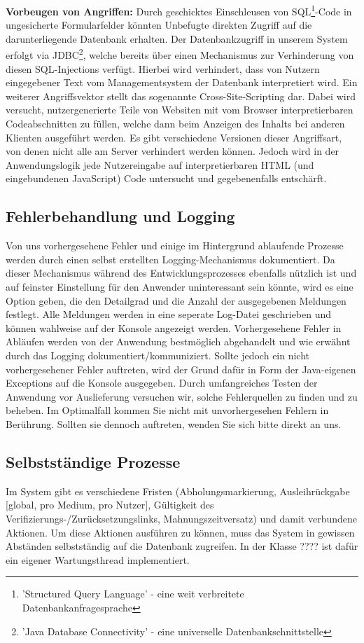 \documentclass{article}
\begin{document}
\textbf{Vorbeugen von Angriffen:} Durch geschicktes Einschleusen von SQL\footnote{'Structured Query Language' - eine weit verbreitete Datenbankanfragesprache}-Code in ungesicherte Formularfelder könnten Unbefugte direkten Zugriff auf die darunterliegende Datenbank erhalten. Der Datenbankzugriff in unserem System erfolgt via JDBC\footnote{'Java Database Connectivity' - eine universelle Datenbankschnittstelle}, welche bereits über einen Mechanismus zur Verhinderung von diesen SQL-Injections verfügt. Hierbei wird verhindert, dass von Nutzern eingegebener Text vom Managementsystem der Datenbank interpretiert wird. Ein weiterer Angriffsvektor stellt das sogenannte Cross-Site-Scripting dar. Dabei wird versucht, nutzergenerierte Teile von Websiten mit vom Browser interpretierbaren Codeabschnitten zu füllen, welche dann beim Anzeigen des Inhalts bei anderen Klienten ausgeführt werden. Es gibt verschiedene Versionen dieser Angriffsart, von denen nicht alle am Server verhindert werden können. Jedoch wird in der Anwendungslogik jede Nutzereingabe auf interpretierbaren HTML (und eingebundenen JavaScript) Code untersucht und gegebenenfalls entschärft.
\subsection{Fehlerbehandlung und Logging}
Von uns vorhergesehene Fehler und einige im Hintergrund ablaufende Prozesse werden durch einen selbst erstellten Logging-Mechanismus dokumentiert. Da dieser Mechanismus während des Entwicklungsprozesses ebenfalls nützlich ist und auf feinster Einstellung für den Anwender uninteressant sein könnte, wird es eine Option geben, die den Detailgrad und die Anzahl der ausgegebenen Meldungen festlegt. Alle Meldungen werden in eine seperate Log-Datei geschrieben und können wahlweise auf der Konsole angezeigt werden. Vorhergesehene Fehler in Abläufen werden von der Anwendung bestmöglich abgehandelt und wie erwähnt durch das Logging dokumentiert/kommuniziert. Sollte jedoch ein nicht vorhergesehener Fehler auftreten, wird der Grund dafür in Form der Java-eigenen Exceptions auf die Konsole ausgegeben. Durch umfangreiches Testen der Anwendung vor Auslieferung versuchen wir, solche Fehlerquellen zu finden und zu beheben. Im Optimalfall kommen Sie nicht mit unvorhergesehen Fehlern in Berührung. Sollten sie dennoch auftreten, wenden Sie sich bitte direkt an uns.
\subsection{Selbstständige Prozesse}
Im System gibt es verschiedene Fristen (Abholungsmarkierung, Ausleihrückgabe [global, pro Medium, pro Nutzer], Gültigkeit des Verifizierungs-/Zurücksetzungslinks, Mahnungszeitversatz) und damit verbundene Aktionen. Um diese Aktionen ausführen zu können, muss das System in gewissen Abständen selbstständig auf die Datenbank zugreifen. In der Klasse ???? ist dafür ein eigener Wartungsthread implementiert.
\end{document}
